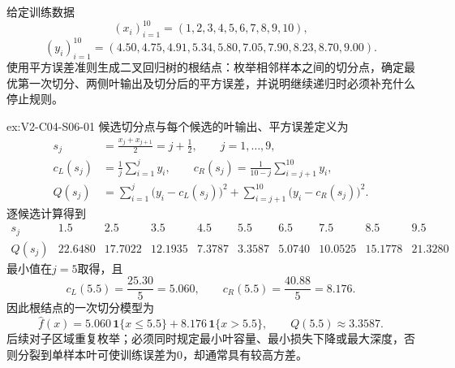 \begin{SLChapterExercisePairSection}

\SLSourceBookExercises

\begin{exercise}\label{ex:V2-C04-S06-01}
给定训练数据
\[
(x_i)_{i=1}^{10}=(1,2,3,4,5,6,7,8,9,10),
\]
\[
(y_i)_{i=1}^{10}=(4.50,4.75,4.91,5.34,5.80,7.05,7.90,8.23,8.70,9.00).
\]
使用平方误差准则生成二叉回归树的根结点：枚举相邻样本之间的切分点，确定最优第一次切分、两侧叶输出及切分后的平方误差，并说明继续递归时必须补充什么停止规则。
\end{exercise}
\ifSLFullEdition
{}\label{sol:V2-C04-S06-01}
\begin{chapterexercisesolution}{ex:V2-C04-S06-01}
候选切分点与每个候选的叶输出、平方误差定义为
\[
\begin{aligned}
s_j&=\frac{x_j+x_{j+1}}2=j+\frac12,\qquad j=1,\ldots,9,\\
c_L(s_j)&=\frac1j\sum_{i=1}^{j}y_i,\qquad
c_R(s_j)=\frac1{10-j}\sum_{i=j+1}^{10}y_i,\\
Q(s_j)&=\sum_{i=1}^{j}\bigl(y_i-c_L(s_j)\bigr)^2
+\sum_{i=j+1}^{10}\bigl(y_i-c_R(s_j)\bigr)^2.
\end{aligned}
\]
逐候选计算得到
\[
\begin{array}{c|ccccccccc}
s_j&1.5&2.5&3.5&4.5&5.5&6.5&7.5&8.5&9.5\\ \hline
Q(s_j)&22.6480&17.7022&12.1935&7.3787&3.3587&5.0740&10.0525&15.1778&21.3280
\end{array}
\]
最小值在$j=5$取得，且
\[
c_L(5.5)=\frac{25.30}{5}=5.060,
\qquad
c_R(5.5)=\frac{40.88}{5}=8.176.
\]
因此根结点的一次切分模型为
\[
\widehat f(x)=5.060\,\mathbf1\{x\le5.5\}+8.176\,\mathbf1\{x>5.5\},
\qquad Q(5.5)\approx3.3587.
\]
后续对子区域重复枚举；必须同时规定最小叶容量、最小损失下降或最大深度，否则分裂到单样本叶可使训练误差为0，却通常具有较高方差。
\end{chapterexercisesolution}
\fi

\SLLectureSupplementExercises


\end{SLChapterExercisePairSection}
